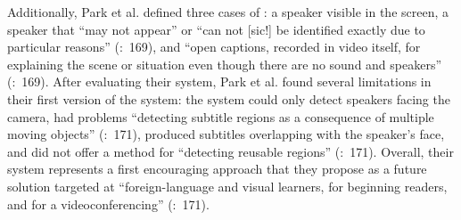 Additionally, Park et al. defined three cases of : a speaker visible in the screen, a speaker that “may not appear” or “can not [sic!] be identified exactly due to particular reasons” (\citeyear{park2008}:~169), and “open captions, recorded in video itself, for explaining the scene or situation even though there are no sound and speakers” (\citeyear{park2008}:~169). After evaluating their system, Park et al. found several limitations in their first version of the system: the system could only detect speakers facing the camera, had problems “detecting subtitle regions as a consequence of multiple moving objects” (\citealt{park2008}:~171), produced subtitles overlapping with the speaker’s face, and did not offer a method for “detecting reusable regions” (\citeyear{park2008}:~171). Overall, their system represents a first encouraging approach that they propose as a future solution targeted at “foreign-language and visual learners, for beginning readers, and for a videoconferencing” (\citeyear{park2008}:~171).

